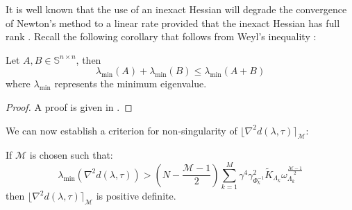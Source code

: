 It is well known that the use of an inexact Hessian will degrade the convergence of Newton's method to a linear rate provided that the inexact Hessian has full rank \cite{Nocedal2006}. Recall the following corollary that follows from Weyl's inequality \cite{HornR2013}:
\begin{corollary}
Let $A, B \in \mathbb{S}^{n \times n}$, then
\begin{equation} \label{e:minEigenvalueLemma}
\lambda_{\min} (A) + \lambda_{\min} (B) \leq \lambda_{\min} (A + B)
\end{equation} 
where $\lambda_{\min}$ represents the minimum eigenvalue.
\end{corollary}
\begin{proof}
A proof is given in \cite{HornR2013}.
\end{proof}
We can now establish a criterion for non-singularity of $\lfloor \nabla^2 d(\lambda, \tau) \rceil_{\mathcal{M}}$:
\begin{lemma} \label{l:nonsingularClippedHessian}
If $\mathcal{M}$ is chosen such that:
\begin{equation} \label{e:nonsingularClippedHessian}
\lambda_{\min}( \nabla^2 d(\lambda, \tau) ) > \left( N -\frac{\mathcal{M} - 1}{2} \right) \sum_{k=1}^M \gamma^4 \gamma_{\Phi_k^{-1}}^2 \tilde{K}_{\Lambda_k} \omega_{\Lambda_k}^{\frac{\mathcal{M} - 1}{2}}
\end{equation}
then $\lfloor \nabla^2 d(\lambda, \tau) \rceil_{\mathcal{M}}$ is positive definite.
\end{lemma}
